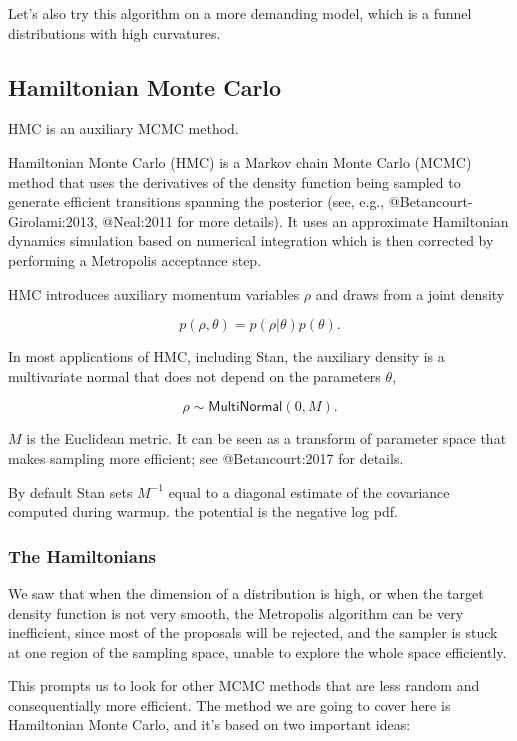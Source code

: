 \documentclass[11pt]{article}
\begin{document}
Let's also try this algorithm on a more demanding model, which is a
funnel distributions with high curvatures.

\subsection{Hamiltonian Monte Carlo}
\label{sec:org2d034ee}
HMC is an auxiliary MCMC method.

Hamiltonian Monte Carlo (HMC) is a Markov chain Monte Carlo (MCMC)
method that uses the derivatives of the density function being sampled
to generate efficient transitions spanning the posterior (see, e.g.,
@Betancourt-Girolami:2013, @Neal:2011 for more details). It uses an
approximate Hamiltonian dynamics simulation based on numerical
integration which is then corrected by performing a Metropolis
acceptance step.

HMC introduces auxiliary momentum variables \(\rho\) and draws from a
joint density

$$
p(\rho, \theta) = p(\rho | \theta) p(\theta).
$$

In most applications of HMC, including Stan, the auxiliary density is a
multivariate normal that does not depend on the parameters \(\theta\),

$$
\rho \sim \mathsf{MultiNormal}(0, M).
$$

\(M\) is the Euclidean metric. It can be seen as a transform of parameter
space that makes sampling more efficient; see @Betancourt:2017 for
details.

By default Stan sets \(M^{-1}\) equal to a diagonal estimate of the
covariance computed during warmup. the potential is the negative log
pdf.

\subsubsection{The Hamiltonians}
\label{the-hamiltonians}
We saw that when the dimension of a distribution is high, or when the
target density function is not very smooth, the Metropolis algorithm can
be very inefficient, since most of the proposals will be rejected, and
the sampler is stuck at one region of the sampling space, unable to
explore the whole space efficiently.

This prompts us to look for other MCMC methods that are less random and
consequentially more efficient. The method we are going to cover here is
Hamiltonian Monte Carlo, and it's based on two important ideas:
\end{document}
